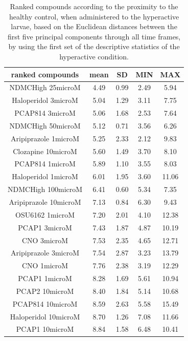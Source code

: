 \documentclass[a4paper,12pt]{article}
\begin{document}
\begin{table}[h!]\tiny
\centering
\caption{Ranked compounds according to the proximity to the healthy control, when administered to the hyperactive larvae, based on the Euclidean distances between the first five principal components through all time frames, by using the first set of the descriptive statistics of the hyperactive condition.}
\begin{tabular}{|c|c|c|c|c|}
\hline
ranked compounds             & mean & SD   & MIN  & MAX   \\ \hline
NDMCHigh 25microM     & 4.49  & 0.99  & 2.49 & 5.94  \\ \hline
Haloperidol 3microM   & 5.04  & 1.29  & 3.11 & 7.75  \\ \hline
PCAP814 3microM       & 5.06  & 1.68  & 2.53 & 7.64  \\ \hline
NDMCHigh 50microM     & 5.12  & 0.71  & 3.56 & 6.26  \\ \hline
Aripiprazole 1microM  & 5.25  & 2.33  & 2.12 & 9.83  \\ \hline
Clozapine 10microM    & 5.60   & 1.49  & 3.70  & 8.10   \\ \hline
PCAP814 1microM       & 5.89  & 1.10   & 3.55 & 8.03  \\ \hline
Haloperidol 1microM   & 6.01  & 1.95  & 3.60  & 11.06 \\ \hline
NDMCHigh 100microM    & 6.41  & 0.60   & 5.34 & 7.35  \\ \hline
Aripiprazole 10microM & 7.13  & 0.84  & 6.30  & 9.43  \\ \hline
OSU6162 1microM       & 7.20   & 2.01  & 4.10  & 12.38 \\ \hline
PCAP1 3microM         & 7.43  & 1.87  & 4.87 & 10.19 \\ \hline
CNO 3microM           & 7.53  & 2.35  & 4.65 & 12.71 \\ \hline
Aripiprazole 3microM  & 7.54  & 2.87  & 3.23 & 13.79 \\ \hline
CNO 1microM           & 7.76  & 2.38  & 3.19 & 12.29 \\ \hline
PCAP1 1microM         & 8.28  & 1.69  & 5.61 & 10.94 \\ \hline
PCAP2 10microM        & 8.40   & 1.84  & 5.14 & 10.68 \\ \hline
PCAP814 10microM      & 8.59  & 2.63  & 5.58 & 15.49 \\ \hline
Haloperidol 10microM  & 8.70   & 1.26  & 7.08 & 11.66 \\ \hline
PCAP1 10microM        & 8.84  & 1.58  & 6.48 & 10.41 \\ \hline

\end{tabular}
\end{table}
\end{document}

